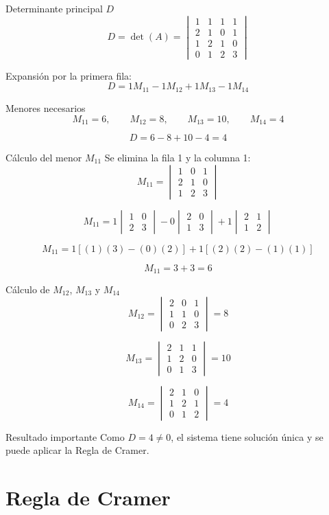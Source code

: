 \documentclass[aspectratio=169]{beamer}
\newcommand{\detm}[1]{\begin{vmatrix}#1\end{vmatrix}}
\begin{document}
\begin{frame}[shrink=8]{Determinante principal $D$}
\[
D=\det(A)=
\detm{
1&1&1&1\\
2&1&0&1\\
1&2&1&0\\
0&1&2&3}
\]

Expansión por la primera fila:
\[
D=1M_{11}-1M_{12}+1M_{13}-1M_{14}
\]

\begin{block}{Menores necesarios}
\[
M_{11}=6,\qquad M_{12}=8,\qquad M_{13}=10,\qquad M_{14}=4
\]
\end{block}

\[
D=6-8+10-4=\boxed{4}
\]
\end{frame}

\begin{frame}[shrink=6]{Cálculo del menor $M_{11}$}
Se elimina la fila 1 y la columna 1:
\[
M_{11}=\detm{1&0&1\\2&1&0\\1&2&3}
\]

\[
M_{11}=1\detm{1&0\\2&3}-0\detm{2&0\\1&3}+1\detm{2&1\\1&2}
\]

\[
M_{11}=1[(1)(3)-(0)(2)]+1[(2)(2)-(1)(1)]
\]

\[
M_{11}=3+3=\boxed{6}
\]
\end{frame}

\begin{frame}[shrink=8]{Cálculo de $M_{12}$, $M_{13}$ y $M_{14}$}
\[
M_{12}=\detm{2&0&1\\1&1&0\\0&2&3}=\boxed{8}
\]

\[
M_{13}=\detm{2&1&1\\1&2&0\\0&1&3}=\boxed{10}
\]

\[
M_{14}=\detm{2&1&0\\1&2&1\\0&1&2}=\boxed{4}
\]

\begin{alertblock}{Resultado importante}
Como $D=4\neq0$, el sistema tiene solución única y se puede aplicar la Regla de Cramer.
\end{alertblock}
\end{frame}

\section{Regla de Cramer}
\end{document}
